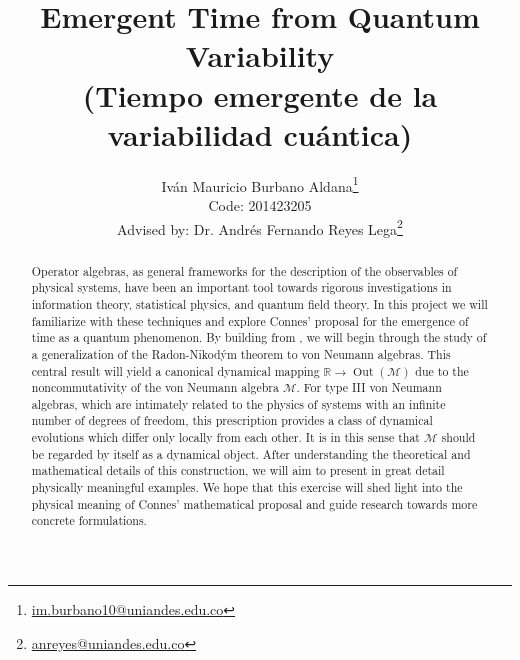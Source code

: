 \documentclass{article}
\title{Emergent Time from Quantum Variability\\{\small (Tiempo emergente de la variabilidad cuántica)}}
\author{Iván Mauricio Burbano Aldana\thanks{\href{mailto:im.burbano10@uniandes.edu.co}{im.burbano10@uniandes.edu.co}}\\
Code: 201423205
\\Advised by: Dr. Andrés Fernando Reyes Lega\thanks{\href{mailto:anreyes@uniandes.edu.co}{anreyes@uniandes.edu.co}}}
\affil{Departamento de F\'{i}sica, Universidad de los Andes,  A.A. 4976-12340, Bogot\'a, Colombia}
\DeclareMathOperator{\Out}{Out}
\begin{document}

\maketitle

\begin{abstract}

Operator algebras, as general frameworks for the description of the observables of physical systems, have been an important tool towards rigorous investigations in information theory, statistical physics, and quantum field theory\cite{Ohya1993, Bratteli1987, Bratteli1997, Connes2008}. In this project we will familiarize with these techniques and explore Connes' proposal for the emergence of time as a quantum phenomenon\cite{Connes2015}. By building from \cite{Burbano2017}, we will begin through the study of a generalization of the Radon-Nikod\'ym theorem to von Neumann algebras\cite{Connes1973}. This central result will yield a canonical dynamical mapping $\mathbb{R}\rightarrow\Out(\mathcal{M})$ due to the noncommutativity of the von Neumann algebra $\mathcal{M}$. For type III von Neumann algebras, which are intimately related to the physics of systems with an infinite number of degrees of freedom\cite{Yngvason2004}, this prescription provides a class of dynamical evolutions which differ only locally from each other. It is in this sense that $\mathcal{M}$ should be regarded by itself as a dynamical object. After understanding the theoretical and mathematical details of this construction, we will aim to present in great detail physically meaningful examples. We hope that this exercise will shed light into the physical meaning of Connes' mathematical proposal and guide research towards more concrete formulations.

\end{abstract}

\end{document}
